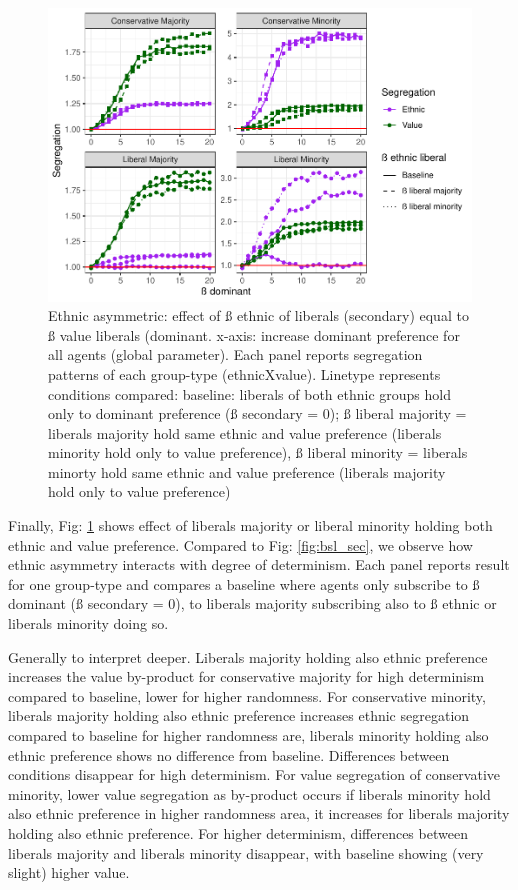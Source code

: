 \documentclass[
]{article}
\begin{document}
\begin{figure}[H]

{\centering \includegraphics[width=1\linewidth]{ev_rum_files/figure-latex/et_lib-1} 

}

\caption{Ethnic asymmetric: effect of ß ethnic of liberals (secondary) equal to ß value liberals (dominant. x-axis: increase dominant preference for all agents (global parameter). Each panel reports segregation patterns of each group-type (ethnicXvalue). Linetype represents conditions compared: baseline: liberals of both ethnic groups hold  only to dominant preference (ß secondary = 0); ß liberal majority = liberals majority hold same ethnic and value preference (liberals minority hold only to value preference), ß liberal minority = liberals minorty hold same ethnic and value preference (liberals majority hold only to value preference)}\label{fig:et_lib}
\end{figure}

Finally, Fig: \ref{fig:et_lib} shows effect of liberals majority or
liberal minority holding both ethnic and value preference. Compared to
Fig: \ref{fig:bsl_sec}, we observe how ethnic asymmetry interacts with
degree of determinism. Each panel reports result for one group-type and
compares a baseline where agents only subscribe to ß dominant (ß
secondary = 0), to liberals majority subscribing also to ß ethnic or
liberals minority doing so.

Generally to interpret deeper. Liberals majority holding also ethnic
preference increases the value by-product for conservative majority for
high determinism compared to baseline, lower for higher randomness. For
conservative minority, liberals majority holding also ethnic preference
increases ethnic segregation compared to baseline for higher randomness
are, liberals minority holding also ethnic preference shows no
difference from baseline. Differences between conditions disappear for
high determinism. For value segregation of conservative minority, lower
value segregation as by-product occurs if liberals minority hold also
ethnic preference in higher randomness area, it increases for liberals
majority holding also ethnic preference. For higher determinism,
differences between liberals majority and liberals minority disappear,
with baseline showing (very slight) higher value.
\end{document}
